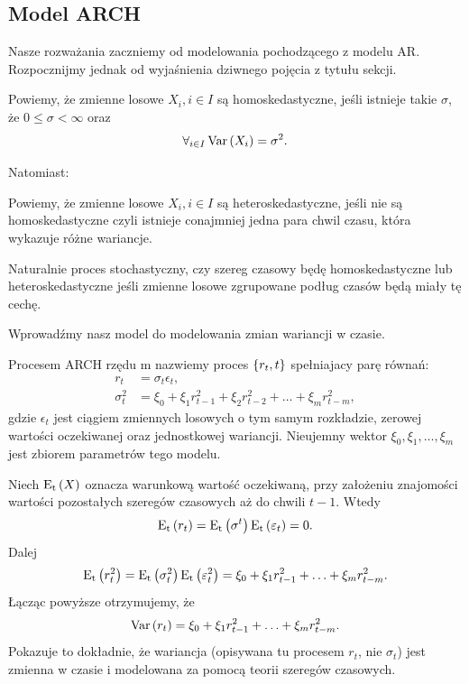 \documentclass[10pt,a4paper]{book}
\begin{document}
\subsection{Model ARCH}

Nasze rozważania zaczniemy od modelowania pochodzącego z modelu AR. Rozpocznijmy jednak od wyjaśnienia dziwnego pojęcia z tytułu sekcji.

\begin{definition}[Homoskedastyczność]
Powiemy, że zmienne losowe $ X_i, i \in I$ są homoskedastyczne, jeśli istnieje takie $\sigma$, że $0 \leq \sigma < \infty$ oraz
$$
\forall_{i \in I} \Variance{X_i} = \sigma^2.
$$
\end{definition}

Natomiast:

\begin{definition}[Heteroskedastyczność]
Powiemy, że zmienne losowe $ X_i, i \in I$ są heteroskedastyczne, jeśli nie są homoskedastyczne czyli istnieje conajmniej jedna para chwil czasu, która wykazuje różne wariancje. 
\end{definition}

Naturalnie proces stochastyczny, czy szereg czasowy będę homoskedastyczne lub heteroskedastyczne jeśli zmienne losowe zgrupowane podług czasów będą miały tę cechę.

Wprowadźmy nasz model do modelowania zmian wariancji w czasie.

\begin{definition}
Procesem ARCH rzędu m nazwiemy proces $\stochasticprocess{r_t}{t}$ spełniajacy parę równań:
\begin{align*}
r_t &= \sigma_t \epsilon_t,\\
\sigma^2_t &= \xi_0 + \xi_1 r_{t-1}^2 + \xi_2 r_{t-2}^2 + \ldots + \xi_m r_{t-m}^2,
\end{align*}
gdzie $\epsilon_t$ jest ciągiem zmiennych losowych o tym samym rozkładzie, zerowej wartości oczekiwanej oraz jednostkowej wariancji. Nieujemny wektor $\xi_0, \xi_1, \ldots, \xi_m$ jest zbiorem parametrów tego modelu.
\end{definition}

\begin{remark}
Niech $\Ex[E_t]{X}$ oznacza warunkową wartość oczekiwaną, przy założeniu znajomości wartości pozostałych szeregów czasowych aż do chwili $t-1$. Wtedy
$$
\Ex[E_t]{r_t} = \Ex[E_t]{\sigma^t} \Ex[E_t]{ \epsilon_t} = 0.
$$
Dalej
$$
\Ex[E_t]{r_t^2} = \Ex[E_t]{\sigma_t^2} \Ex[E_t]{\epsilon_t^2} = \xi_0 + \xi_1 r_{t-1}^2 + \ldots + \xi_m r_{t-m}^2.
$$
Łącząc powyższe otrzymujemy, że
$$
\Variance{r_t } =  \xi_0 + \xi_1 r_{t-1}^2 + \ldots + \xi_m r_{t-m}^2.
$$
Pokazuje to dokładnie, że wariancja (opisywana tu procesem $r_t$, nie $\sigma_t$) jest zmienna w czasie i modelowana za pomocą teorii szeregów czasowych.
\end{remark}
\end{document}
